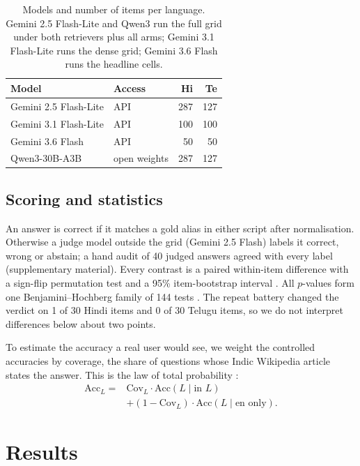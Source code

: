 \begin{table}[t]
\centering\small
\setlength{\tabcolsep}{4pt}
\begin{tabular}{@{}llrr@{}}
\toprule
Model & Access & Hi & Te \\
\midrule
Gemini 2.5 Flash-Lite & API & 287 & 127 \\
Gemini 3.1 Flash-Lite & API & 100 & 100 \\
Gemini 3.6 Flash & API & 50 & 50 \\
Qwen3-30B-A3B & open weights & 287 & 127 \\
\bottomrule
\end{tabular}
\caption{Models and number of items per language. Gemini 2.5 Flash-Lite and Qwen3 run the full grid under both retrievers plus all arms; Gemini 3.1 Flash-Lite runs the dense grid; Gemini 3.6 Flash runs the headline cells.}
\label{tab:models}
\end{table}

\subsection{Scoring and statistics}
\label{sec:stats}
An answer is correct if it matches a gold alias in either script after normalisation. Otherwise a judge model outside the grid (Gemini 2.5 Flash) labels it correct, wrong or abstain; a hand audit of 40 judged answers agreed with every label (supplementary material). Every contrast is a paired within-item difference with a sign-flip permutation test and a 95\% item-bootstrap interval \citep{efron1994bootstrap}. All $p$-values form one Benjamini--Hochberg family of 144 tests \citep{benjamini1995bh}. The repeat battery changed the verdict on 1 of 30 Hindi items and 0 of 30 Telugu items, so we do not interpret differences below about two points.

To estimate the accuracy a real user would see, we weight the controlled accuracies by coverage, the share of questions whose Indic Wikipedia article states the answer. This is the law of total probability \citep{ross2014probability}:
\begin{equation}
\begin{split}
\mathrm{Acc}_L ={}& \mathrm{Cov}_L \cdot \mathrm{Acc}(L \mid \text{in } L)\\
&+ (1-\mathrm{Cov}_L)\cdot \mathrm{Acc}(L \mid \text{en only}).
\end{split}
\label{eq:decomp}
\end{equation}

\section{Results}
\label{sec:results}

